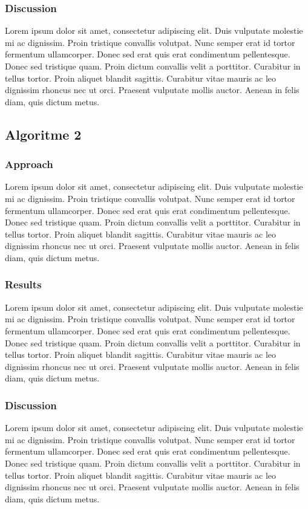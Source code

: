 \documentclass[11pt]{article}
\begin{document}
\subsubsection{Discussion}
Lorem ipsum dolor sit amet, consectetur adipiscing elit. Duis vulputate molestie mi ac dignissim. Proin tristique convallis volutpat. Nunc semper erat id tortor fermentum ullamcorper. Donec sed erat quis erat condimentum pellentesque. Donec sed tristique quam. Proin dictum convallis velit a porttitor. Curabitur in tellus tortor. Proin aliquet blandit sagittis. Curabitur vitae mauris ac leo dignissim rhoncus nec ut orci. Praesent vulputate mollis auctor. Aenean in felis diam, quis dictum metus.

\subsection{Algoritme 2}
\subsubsection{Approach}
Lorem ipsum dolor sit amet, consectetur adipiscing elit. Duis vulputate molestie mi ac dignissim. Proin tristique convallis volutpat. Nunc semper erat id tortor fermentum ullamcorper. Donec sed erat quis erat condimentum pellentesque. Donec sed tristique quam. Proin dictum convallis velit a porttitor. Curabitur in tellus tortor. Proin aliquet blandit sagittis. Curabitur vitae mauris ac leo dignissim rhoncus nec ut orci. Praesent vulputate mollis auctor. Aenean in felis diam, quis dictum metus.

\subsubsection{Results}

Lorem ipsum dolor sit amet, consectetur adipiscing elit. Duis vulputate molestie mi ac dignissim. Proin tristique convallis volutpat. Nunc semper erat id tortor fermentum ullamcorper. Donec sed erat quis erat condimentum pellentesque. Donec sed tristique quam. Proin dictum convallis velit a porttitor. Curabitur in tellus tortor. Proin aliquet blandit sagittis. Curabitur vitae mauris ac leo dignissim rhoncus nec ut orci. Praesent vulputate mollis auctor. Aenean in felis diam, quis dictum metus.

\subsubsection{Discussion}
Lorem ipsum dolor sit amet, consectetur adipiscing elit. Duis vulputate molestie mi ac dignissim. Proin tristique convallis volutpat. Nunc semper erat id tortor fermentum ullamcorper. Donec sed erat quis erat condimentum pellentesque. Donec sed tristique quam. Proin dictum convallis velit a porttitor. Curabitur in tellus tortor. Proin aliquet blandit sagittis. Curabitur vitae mauris ac leo dignissim rhoncus nec ut orci. Praesent vulputate mollis auctor. Aenean in felis diam, quis dictum metus.
\end{document}
